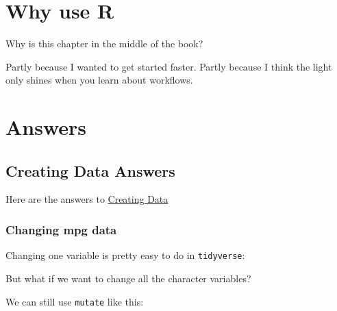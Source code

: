 \documentclass[
]{book}
\newenvironment{Shaded}{\begin{snugshade}}{\end{snugshade}}
\newcommand{\DataTypeTok}[1]{\textcolor[rgb]{0.13,0.29,0.53}{#1}}
\newcommand{\KeywordTok}[1]{\textcolor[rgb]{0.13,0.29,0.53}{\textbf{#1}}}
\newcommand{\NormalTok}[1]{#1}
\newcommand{\OperatorTok}[1]{\textcolor[rgb]{0.81,0.36,0.00}{\textbf{#1}}}
\newcommand{\StringTok}[1]{\textcolor[rgb]{0.31,0.60,0.02}{#1}}
\begin{document}
\hypertarget{whyr}{%
\chapter{Why use R}\label{whyr}}

Why is this chapter in the middle of the book?

Partly because I wanted to get started faster. Partly because I think the light only shines when you learn about workflows.

\hypertarget{answers}{%
\chapter{Answers}\label{answers}}

\hypertarget{ans_createdata}{%
\section{Creating Data Answers}\label{ans_createdata}}

Here are the answers to \protect\hyperlink{ex_createdata}{Creating Data}

\hypertarget{changing-mpg-data}{%
\subsection{Changing mpg data}\label{changing-mpg-data}}

Changing one variable is pretty easy to do in \texttt{tidyverse}:

\begin{Shaded}
\end{Shaded}

But what if we want to change all the character variables?

We can still use \texttt{mutate} like this:

\begin{Shaded}
\end{Shaded}
\end{document}
